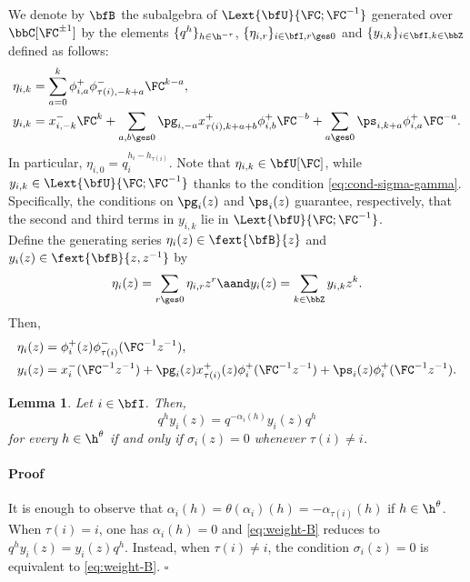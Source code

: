 \documentclass[reqno]{amsart}
\numberwithin{equation}{section}
\newtheorem*{lemma}{Lemma}
\newenvironment{pf}{\medskip\paragraph{{\sc Proof}}}{\hfill$\square$\par\medskip}
\begin{document}
We denote by $\bfB$ the subalgebra of $\Lext{\bfU}{\FC;\FC^{-1}}$ generated 
over $\bbC[\FC^{\pm1}]$ by the elements $\{q^{h}\}_{h\in\h^{-\tau}}$, $\{\eta_{i,r}\}_{i\in\bfI,r\ges0}$ and $\{y_{i,k}\}_{i\in\bfI, k\in\bbZ}$ defined as follows:
\begin{equation}\label{eq:B-generators}
\begin{aligned}
	\eta_{i,k} &= \sum_{a=0}^{k} \phi_{i,a}^{+} \phi_{\tau(i),-k+a}^{-} \FC^{k-a},\\
	y_{i,k} &= x_{i, -k}^{-} \FC^k + \sum_{a,b \ges 0} \pg_{i,-a} x_{\tau(i),k+a+b}^{+} \phi_{i,b}^{+} \FC^{-b} + \sum_{a \ges 0} \ps_{i,k+a} \phi_{i,a}^{+} \FC^{-a}.
\end{aligned}
\end{equation}
In particular, $\eta_{i,0} = q_i^{h_i-h_{\tau(i)}}$.
Note that $\eta_{i,k}\in\bfU[\FC]$, while $y_{i,k}\in\Lext{\bfU}{\FC;\FC^{-1}}$ thanks to the condition \eqref{eq:cond-sigma-gamma}. Specifically, the conditions on $\pg_i(z)$ and $\ps_i(z)$ guarantee, respectively, that the second and third terms in $y_{i,k}$ lie in $\Lext{\bfU}{\FC;\FC^{-1}}$.\\

Define the generating series $\eta_{i}(z)\in\fext{\bfB}{z}$ and $y_i(z)\in\fext{\bfB}{z,z^{-1}}$ by
\begin{equation}
	\eta_{i}(z)=\sum_{r\ges0}\eta_{i,r}z^r\aand y_i(z)=\sum_{k\in\bbZ}y_{i,k}z^k.
\end{equation}
Then, 
\begin{align} \label{eq: eta defi}
	\eta_{i}(z) &= \phi_{i}^{+}(z) \phi_{\tau(i)}^{-}(\FC^{-1}{z}^{-1}),\\ \label{eq: y defi}
	y_{i}(z) &= x_{i}^{-}(\FC^{-1}{z}^{-1}) + \pg_{i}(z) x_{\tau(i)}^{+}(z) \phi_{i}^{+}(\FC^{-1} z^{-1}) + \ps_{i}(z) \phi_{i}^{+}(\FC^{-1}z^{-1}).
\end{align}

\begin{lemma}
	Let $i\in\bfI$. Then,
\begin{equation}\label{eq:weight-B}
q^{h}y_i(z)=q^{-\alpha_i(h)}y_i(z)q^{h}
\end{equation}
for every $h\in\h^{\theta}$ if and only if $\sigma_i(z)=0$ whenever $\tau(i)\neq i$.
\end{lemma}
\begin{pf} It is enough to observe that 
$\alpha_i(h)=\theta(\alpha_i)(h)=-\alpha_{\tau(i)}(h)$ if $h\in\h^\theta$.
When $\tau(i)=i$, one has $\alpha_i(h)=0$ and \eqref{eq:weight-B}
reduces to $q^{h}y_i(z)=y_i(z)q^{h}$. Instead, when $\tau(i)\neq i$, the condition 
$\sigma_i(z)=0$ is equivalent to \eqref{eq:weight-B}.
\end{pf}
\end{document}
